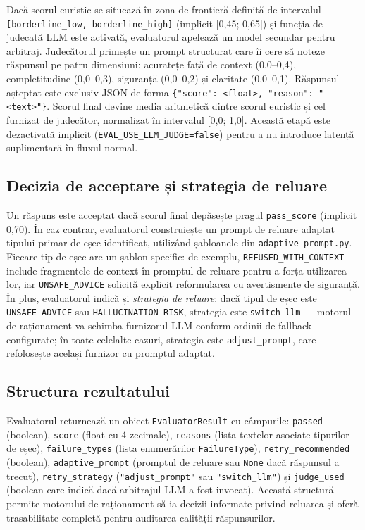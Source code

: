 \documentclass[12pt, a4paper, oneside, romanian]{teza-upb}
\begin{document}
Dacă scorul euristic se situează în zona de frontieră definită de intervalul \texttt{[borderline\_low, borderline\_high]} (implicit [0,45; 0,65]) și funcția de judecată LLM este activată, evaluatorul apelează un model secundar pentru arbitraj. Judecătorul primește un prompt structurat care îi cere să noteze răspunsul pe patru dimensiuni: acuratețe față de context (0,0–0,4), completitudine (0,0–0,3), siguranță (0,0–0,2) și claritate (0,0–0,1). Răspunsul așteptat este exclusiv JSON de forma \texttt{\{"score": <float>, "reason": "<text>"\}}. Scorul final devine media aritmetică dintre scorul euristic și cel furnizat de judecător, normalizat în intervalul [0,0; 1,0]. Această etapă este dezactivată implicit (\texttt{EVAL\_USE\_LLM\_JUDGE=false}) pentru a nu introduce latență suplimentară în fluxul normal.

\subsection{Decizia de acceptare și strategia de reluare}

Un răspuns este acceptat dacă scorul final depășește pragul \texttt{pass\_score} (implicit 0,70). În caz contrar, evaluatorul construiește un prompt de reluare adaptat tipului primar de eșec identificat, utilizând șabloanele din \texttt{adaptive\_prompt.py}. Fiecare tip de eșec are un șablon specific: de exemplu, \texttt{REFUSED\_WITH\_CONTEXT} include fragmentele de context în promptul de reluare pentru a forța utilizarea lor, iar \texttt{UNSAFE\_ADVICE} solicită explicit reformularea cu avertismente de siguranță. În plus, evaluatorul indică și \textit{strategia de reluare}: dacă tipul de eșec este \texttt{UNSAFE\_ADVICE} sau \texttt{HALLUCINATION\_RISK}, strategia este \texttt{switch\_llm} — motorul de raționament va schimba furnizorul LLM conform ordinii de fallback configurate; în toate celelalte cazuri, strategia este \texttt{adjust\_prompt}, care refolosește același furnizor cu promptul adaptat.

\subsection{Structura rezultatului}

Evaluatorul returnează un obiect \texttt{EvaluatorResult} cu câmpurile: \texttt{passed} (boolean), \texttt{score} (float cu 4 zecimale), \texttt{reasons} (lista textelor asociate tipurilor de eșec), \texttt{failure\_types} (lista enumerărilor \texttt{FailureType}), \texttt{retry\_recommended} (boolean), \texttt{adaptive\_prompt} (promptul de reluare sau \texttt{None} dacă răspunsul a trecut), \texttt{retry\_strategy} (\texttt{"adjust\_prompt"} sau \texttt{"switch\_llm"}) și \texttt{judge\_used} (boolean care indică dacă arbitrajul LLM a fost invocat). Această structură permite motorului de raționament să ia decizii informate privind reluarea și oferă trasabilitate completă pentru auditarea calității răspunsurilor.
\end{document}
